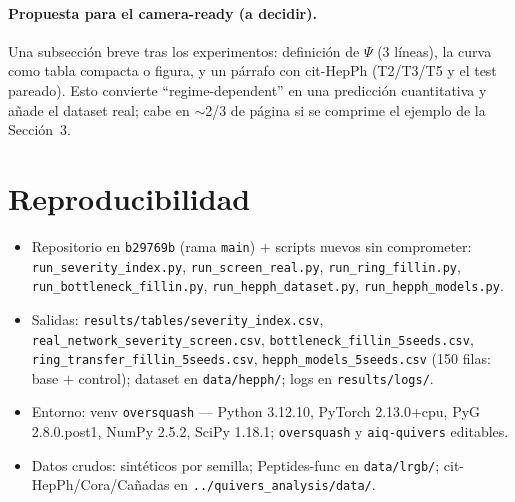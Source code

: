 \documentclass[11pt]{article}
\begin{document}
\paragraph{Propuesta para el camera-ready (a decidir).} Una subsecci\'on
breve tras los experimentos: definici\'on de $\Psi$ (3 l\'ineas), la curva
como tabla compacta o figura, y un p\'arrafo con cit-HepPh (T2/T3/T5 y el
test pareado). Esto convierte ``regime-dependent'' en una predicci\'on
cuantitativa y a\~nade el dataset real; cabe en $\sim$2/3 de p\'agina si se
comprime el ejemplo de la Secci\'on~3.

\section{Reproducibilidad}

\begin{itemize}
  \item Repositorio en \texttt{b29769b} (rama \texttt{main}) $+$ scripts
  nuevos sin comprometer: \texttt{run\_severity\_index.py},
  \texttt{run\_screen\_real.py}, \texttt{run\_ring\_fillin.py},
  \texttt{run\_bottleneck\_fillin.py}, \texttt{run\_hepph\_dataset.py},
  \texttt{run\_hepph\_models.py}.
  \item Salidas: \texttt{results/tables/severity\_index.csv},
  \texttt{real\_network\_severity\_screen.csv},
  \texttt{bottleneck\_fillin\_5seeds.csv},
  \texttt{ring\_transfer\_fillin\_5seeds.csv},
  \texttt{hepph\_models\_5seeds.csv} (150 filas: base $+$ control);
  dataset en \texttt{data/hepph/}; logs en \texttt{results/logs/}.
  \item Entorno: venv \texttt{oversquash} --- Python 3.12.10, PyTorch
  2.13.0+cpu, PyG 2.8.0.post1, NumPy 2.5.2, SciPy 1.18.1;
  \texttt{oversquash} y \texttt{aiq-quivers} editables.
  \item Datos crudos: sint\'eticos por semilla; Peptides-func en
  \texttt{data/lrgb/}; cit-HepPh/Cora/Ca\~nadas en
  \texttt{../quivers\_analysis/data/}.
\end{itemize}
\end{document}
